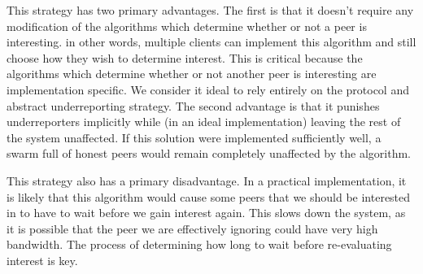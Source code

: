 This strategy has two primary advantages. The first is that it doesn't require any modification of the algorithms which determine whether or not a peer is interesting. in other words, multiple clients can implement this algorithm and still choose how they wish to determine interest. This is critical because the algorithms which determine whether or not another peer is interesting are implementation specific. We consider it ideal to rely entirely on the protocol and abstract underreporting strategy. The second advantage is that it punishes underreporters implicitly while (in an ideal implementation) leaving the rest of the system unaffected. If this solution were implemented sufficiently well, a swarm full of honest peers would remain completely unaffected by the algorithm.

This strategy also has a primary disadvantage. In a practical implementation, it is likely that this algorithm would cause some peers that we should be interested in to have to wait before we gain interest again. This slows down the system, as it is possible that the peer we are effectively ignoring could have very high bandwidth. The process of determining how long to wait before re-evaluating interest is key.
